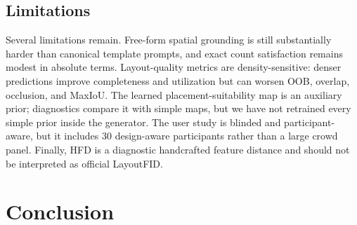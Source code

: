 \documentclass[review]{elsarticle}
\begin{document}
\begin{table}[!t]
\caption{\textbf{User-study summary.}
Confidence intervals are descriptive bootstrap intervals over participants/items.}
\label{tab:user_study_compact}
\centering
\small
{}
\end{table}

\subsection{Limitations}
\label{sec:limitations}

Several limitations remain.
Free-form spatial grounding is still substantially harder than canonical template prompts, and exact count satisfaction remains modest in absolute terms.
Layout-quality metrics are density-sensitive: denser predictions improve completeness and utilization but can worsen OOB, overlap, occlusion, and MaxIoU.
The learned placement-suitability map is an auxiliary prior; diagnostics compare it with simple maps, but we have not retrained every simple prior inside the generator.
The user study is blinded and participant-aware, but it includes 30 design-aware participants rather than a large crowd panel.
Finally, HFD is a diagnostic handcrafted feature distance and should not be interpreted as official LayoutFID.

\section{Conclusion}
\label{sec:conclusion}
\end{document}
